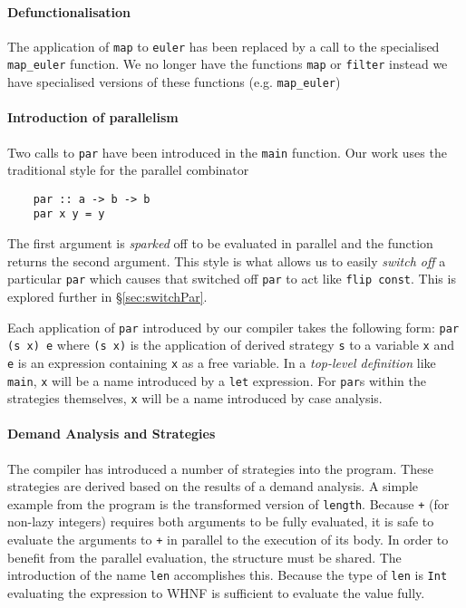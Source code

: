 \paragraph{Defunctionalisation}
The application of \verb-map- to \verb-euler- has been replaced by a call to
the specialised \verb-map_euler- function.  We no longer have the functions
\verb-map- or \verb-filter- instead we have specialised versions of these
functions (e.g. \verb-map_euler-)

\paragraph{Introduction of parallelism}
Two calls to \verb-par- have been introduced in the \texttt{main} function. Our
work uses the traditional style for the parallel combinator \citep{strategies}

\begin{verbatim}
    par :: a -> b -> b
    par x y = y
\end{verbatim}

The first argument is \emph{sparked} off to be evaluated in parallel and the
function returns the second argument. This style is what allows us to easily
\emph{switch off} a particular \verb-par- which causes that switched off
\verb-par- to act like \verb-flip const-. This is explored further in
\S\ref{sec:switchPar}.

Each application of \verb-par- introduced by our compiler takes the following
form: \verb-par (s x) e- where \verb-(s x)- is the application of derived
strategy \verb-s- to a variable \verb$x$ and \verb$e$ is an expression containing \verb$x$ as a
free variable.  In a \emph{top-level definition} like \verb-main-, \verb$x$ will be a
name introduced by a \verb-let- expression. For \verb-par-s within the
strategies themselves, \verb$x$ will be a name introduced by case analysis.

\paragraph{Demand Analysis and Strategies}

The compiler has introduced a number of strategies into the program. These
strategies are derived based on the results of a demand analysis. A simple
example from the program is the transformed version of \verb-length-. Because
\verb-+- (for non-lazy integers) requires both arguments to be fully evaluated, it is safe to 
evaluate the arguments to \verb-+- in parallel to the execution of its body.
In order to benefit from the parallel evaluation, the structure must be shared.
The introduction of the name \verb-len- accomplishes this. Because the type
of \verb-len- is \verb-Int- evaluating the expression to WHNF is sufficient to
evaluate the value fully. 

